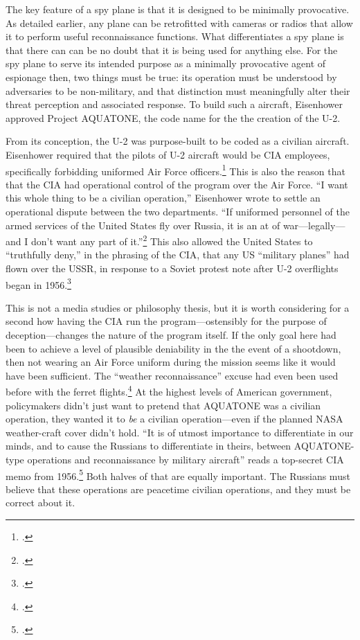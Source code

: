 \documentclass[12pt]{article}
\begin{document}
The key feature of a spy plane is that it is designed to be minimally provocative. As detailed earlier, any plane can be retrofitted with cameras or radios that allow it to perform useful reconnaissance functions. What differentiates a spy plane is that there can can be no doubt that it is being used for anything else. For the spy plane to serve its intended purpose as a minimally provocative agent of espionage then, two things must be true: its operation must be understood by adversaries to be non-military, and that distinction must meaningfully alter their threat perception and associated response. To build such a aircraft, Eisenhower approved Project AQUATONE, the code name for the the creation of the U-2.

From its conception, the U-2 was purpose-built to be coded as a civilian aircraft. Eisenhower required that the pilots of U-2 aircraft would be CIA employees, specifically forbidding uniformed Air Force officers.\footcite[p.~33]{lindgren_trust_2000} This is also the reason that that the CIA had operational control of the program over the Air Force. ``I want this whole thing to be a civilian operation,'' Eisenhower wrote to settle an operational dispute between the two departments. ``If uniformed personnel of the armed services of the United States fly over Russia, it is an at of war---legally---and I don't want any part of it.''\footcite[p.~60. The original source for this quote is an \emph{OSA History} that requires codeword clearance. It is quoted here by the History Staff of the CIA.]{pedlow_cia_1998} This also allowed the United States to ``truthfully deny,'' in the phrasing of the CIA, that any US ``military planes'' had flown over the USSR, in response to a Soviet protest note after U-2 overflights began in 1956.\footcite[p.~109]{pedlow_cia_1998}

This is not a media studies or philosophy thesis, but it is worth considering for a second how having the CIA run the program---ostensibly for the purpose of deception---changes the nature of the program itself. If the only goal here had been to achieve a level of plausible deniability in the the event of a shootdown, then not wearing an Air Force uniform during the mission seems like it would have been sufficient. The ``weather reconnaissance'' excuse had even been used before with the ferret flights.\footcite[p.~45]{farquhar_aerial_2015} At the highest levels of American government, policymakers didn't just want to pretend that AQUATONE was a civilian operation, they wanted it to \emph{be} a civilian operation---even if the planned NASA weather-craft cover didn't hold. ``It is of utmost importance to differentiate in our minds, and to cause the Russians to differentiate in theirs, between AQUATONE-type operations and reconnaissance by military aircraft'' reads a top-secret CIA memo from 1956.\footcite[p.~1]{miller_suggestions_1956} Both halves of that are equally important. The Russians must believe that these operations are peacetime civilian operations, and they must be correct about it.
\end{document}
